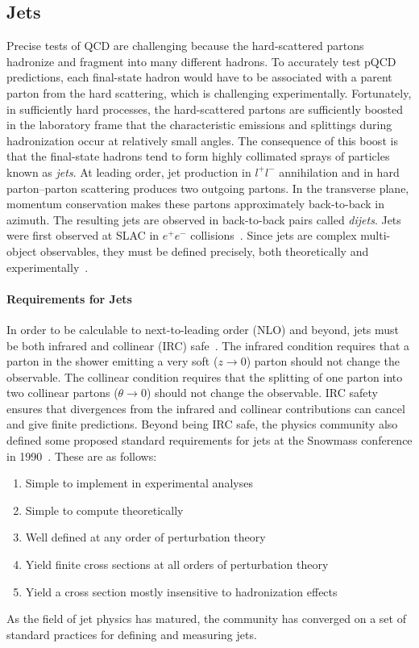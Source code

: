 \subsection{Jets}
Precise tests of QCD are challenging because the hard-scattered partons hadronize and fragment into many different hadrons.
To accurately test pQCD predictions, each final-state hadron would have to be associated with a parent parton from the hard scattering, which is challenging experimentally.
Fortunately, in sufficiently hard processes, the hard-scattered partons are sufficiently boosted in the laboratory frame that the characteristic emissions and splittings during hadronization occur at relatively small angles.
The consequence of this boost is that the final-state hadrons tend to form highly collimated sprays of particles known as \textit{jets}.
At leading order, jet production in $l^+l^-$ annihilation and in hard parton--parton scattering produces two outgoing partons.
In the transverse plane, momentum conservation makes these partons approximately back-to-back in azimuth.
The resulting jets are observed in back-to-back pairs called \textit{dijets}.
Jets were first observed at SLAC in $e^+e^-$ collisions~\cite{Jet:SLAC}.
Since jets are complex multi-object observables, they must be defined precisely, both theoretically and experimentally~\cite{Jet:QCD}.

\paragraph{Requirements for Jets}
In order to be calculable to next-to-leading order (NLO) and beyond, jets must be both infrared and collinear (IRC) safe~\cite{pdg}.
The infrared condition requires that a parton in the shower emitting a very soft ($z\to0$) parton should not change the observable.
The collinear condition requires that the splitting of one parton into two collinear partons ($\theta \to 0$) should not change the observable.
IRC safety ensures that divergences from the infrared and collinear contributions can cancel and give finite predictions.
Beyond being IRC safe, the physics community also defined some proposed standard requirements for jets at the Snowmass conference in 1990~\cite{Jet:Snowmass}.
These are as follows:
\begin{enumerate}
    \item Simple to implement in experimental analyses
    \item Simple to compute theoretically
    \item Well defined at any order of perturbation theory
    \item Yield finite cross sections at all orders of perturbation theory
    \item Yield a cross section mostly insensitive to hadronization effects
\end{enumerate}
As the field of jet physics has matured, the community has converged on a set of standard practices for defining and measuring jets.

